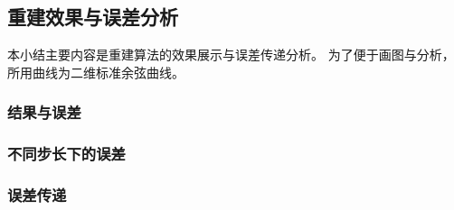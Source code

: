 \subsection{重建效果与误差分析}

本小结主要内容是重建算法的效果展示与误差传递分析。
为了便于画图与分析，所用曲线为二维标准余弦曲线。

\subsubsection{结果与误差}

\begin{center}
    
\end{center}

\begin{center}
    
\end{center}

\subsubsection{不同步长下的误差}

\begin{center}
    
\end{center}

\subsubsection{误差传递}

\begin{center}
    
\end{center}

\begin{center}
    
\end{center}

